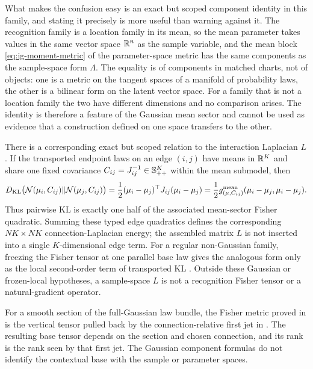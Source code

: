 What makes the confusion easy is an exact but scoped component identity in this family, and stating it precisely is more useful than warning against it. The recognition family is a location family in its mean, so the mean parameter takes values in the same vector space $\mathbb R^{n}$ as the sample variable, and the mean block \eqref{eq:ig-moment-metric} of the parameter-space metric has the same components as the sample-space form $\Lambda$. The equality is of components in matched charts, not of objects: one is a metric on the tangent spaces of a manifold of probability laws, the other is a bilinear form on the latent vector space. For a family that is not a location family the two have different dimensions and no comparison arises. The identity is therefore a feature of the Gaussian mean sector and cannot be used as evidence that a construction defined on one space transfers to the other. 

There is a corresponding exact but scoped relation to the interaction
Laplacian \(L\). If the transported endpoint laws on an edge $(i,j)$ have
means in $\mathbb R^K$ and share one fixed covariance
$C_{ij}=J_{ij}^{-1}\in\mathbb S_{++}^K$ within the mean submodel, then
\begin{equation}
D_{\mathrm{KL}}\bigl(\mathcal N(\mu_i,C_{ij})\Vert\mathcal N(\mu_j,C_{ij})\bigr)
=\frac12(\mu_i-\mu_j)^\top J_{ij}(\mu_i-\mu_j)
=\frac12g^{\rm mean}_{(\mu,C_{ij})}(\mu_i-\mu_j,\mu_i-\mu_j).
\label{eq:ig-fixed-covariance-kl-fisher}
\end{equation}
Thus pairwise KL is exactly one half of the associated mean-sector Fisher
quadratic. Summing these typed edge quadratics defines the corresponding
$NK\times NK$ connection-Laplacian energy; the assembled matrix $L$ is not
inserted into a single $K$-dimensional edge term. For a regular non-Gaussian family, freezing the
Fisher tensor at one parallel base law gives the analogous form only as the
local second-order term of transported KL \citep{AmariNagaoka2000}. Outside
these Gaussian or frozen-local hypotheses, a sample-space $L$ is not a
recognition Fisher tensor or a natural-gradient operator.

For a smooth section of the full-Gaussian law bundle, the Fisher metric proved
in  is the vertical tensor pulled back by the
connection-relative first jet in .  The
resulting base tensor depends on the section and chosen connection, and its
rank is the rank seen by that first jet.  The Gaussian component formulas do
not identify the contextual base with the sample or parameter spaces.

